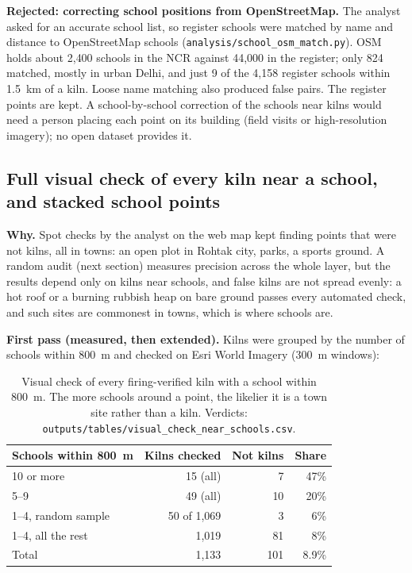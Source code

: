 \documentclass[11pt,a4paper]{article}
\begin{document}
\textbf{Rejected: correcting school positions from OpenStreetMap.} The analyst asked
for an accurate school list, so register schools were matched by name and distance
to OpenStreetMap schools (\texttt{analysis/school\_osm\_match.py}). OSM holds about
2{,}400 schools in the NCR against 44{,}000 in the register; only 824 matched, mostly
in urban Delhi, and just 9 of the 4{,}158 register schools within 1.5~km of a kiln.
Loose name matching also produced false pairs. The register points are kept. A
school-by-school correction of the schools near kilns would need a person
placing each point on its building (field visits or high-resolution imagery); no
open dataset provides it.

\subsection{Full visual check of every kiln near a school, and stacked school points}
\label{sec:fullcheck}
\textbf{Why.} Spot checks by the analyst on the web map kept finding points that
were not kilns, all in towns: an open plot in Rohtak city, parks, a sports ground.
A random audit (next section) measures precision across the whole layer, but the
results depend only on kilns near schools, and false kilns are not spread evenly:
a hot roof or a burning rubbish heap on bare ground passes every automated check,
and such sites are commonest in towns, which is where schools are.

\textbf{First pass (measured, then extended).} Kilns were grouped by the number of
schools within 800~m and checked on Esri World Imagery (300~m windows):

\begin{table}[H]
\centering\small
\begin{tabular}{@{}lrrr@{}}
\toprule
Schools within 800~m & Kilns checked & Not kilns & Share \\
\midrule
10 or more            & 15 (all)        &  7 & 47\% \\
5--9                  & 49 (all)        & 10 & 20\% \\
1--4, random sample   & 50 of 1{,}069   &  3 &  6\% \\
1--4, all the rest    & 1{,}019         & 81 &  8\% \\
\midrule
Total                 & 1{,}133         & 101 & 8.9\% \\
\bottomrule
\end{tabular}
\caption{Visual check of every firing-verified kiln with a school within 800~m.
The more schools around a point, the likelier it is a town site rather than a
kiln. Verdicts: \texttt{outputs/tables/visual\_check\_near\_schools.csv}.}
\end{table}
\end{document}
